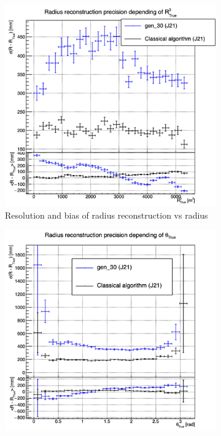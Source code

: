 \documentclass[../main.tex]{subfiles}
\begin{document}
{{\begin{figure}[ht]
  \begin{subfigure}[t]{0.32\linewidth}
    \centering
    \includegraphics[width=\linewidth]{images/jcnn/vic_cnn/multi_vic_cnn_MSBvRTC.png}
    \caption{Resolution and bias of radius reconstruction vs radius}
    \label{fig:jcnn:vic_cnn:multi_vic_cnn_MSBvRTC}
  \end{subfigure}
  \begin{subfigure}[t]{0.32\linewidth}
    \centering
    \includegraphics[width=\linewidth]{images/jcnn/vic_cnn/multi_vic_cnn_MSBvTTC.png}

\end{subfigure}
\end{figure}}}
\end{document}

